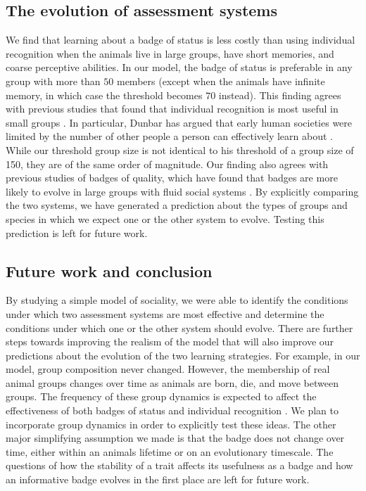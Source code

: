 \subsection*{The evolution of assessment systems} %

We find that learning about a badge of status is less costly than using individual recognition when the animals live in large groups, have short memories, and coarse perceptive abilities. In our model, the badge of status is preferable in any group with more than $50$ members (except when the animals have infinite memory, in which case the threshold becomes $70$ instead). This finding agrees with previous studies that found that individual recognition is most useful in small groups \citep{Veiga:1993fk}. In particular, Dunbar has argued that early human societies were limited by the number of other people a person can effectively learn about \citep{Dunbar:1993zr,Hill:2003ly}. While our threshold group size is not identical to his threshold of a group size of 150, they are of the same order of magnitude. Our finding also agrees with previous studies of badges of quality, which have found that badges are more likely to evolve in large groups with fluid social systems \citep{Rohwer:1975fk,Tibbetts:2009kx}. By explicitly comparing the two systems, we have generated a prediction about the types of groups and species in which we expect one or the other system to evolve. Testing this prediction is left for future work. 

 
\subsection*{Future work and conclusion}
 
By studying a simple model of sociality, we were able to identify the conditions under which two assessment systems are most effective and determine the conditions under which one or the other system should evolve. There are further steps towards improving the realism of the model that will also improve our predictions about the evolution of the two learning strategies. For example, in our model, group composition never changed. However, the membership of real animal groups changes over time as animals are born, die, and move between groups. The frequency of these group dynamics is expected to affect the effectiveness of both badges of status \citep{Rohwer:1975fk,Tibbetts:2009kx} and individual recognition \citep{Whitfield:1987tg,Veiga:1993fk}. We plan to incorporate group dynamics in order to explicitly test these ideas. The other major simplifying assumption we made is that the badge does not change over time, either within an animals lifetime or on an evolutionary timescale. The questions of how the stability of a trait affects its usefulness as a badge and how an informative badge evolves in the first place are left for future work.

